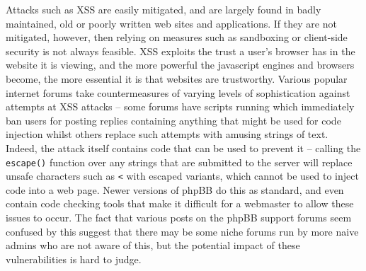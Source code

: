 Attacks such as XSS are easily mitigated\cite{cheatsheet}, and are largely found in badly maintained, old or poorly
written web sites and applications. If they are not mitigated, however, then relying on measures such as sandboxing or
client-side security is not always feasible. XSS exploits the trust a user's browser has in the website it is viewing,
and the more powerful the javascript engines and browsers become, the more essential it is that websites are
trustworthy. Various popular internet forums take countermeasures of varying levels of sophistication against attempts
at XSS attacks -- some forums have scripts running which immediately ban users for posting replies containing
anything that might be used for code injection whilst others replace such attempts with amusing strings of text. Indeed,
the attack itself contains code that can be used to prevent it -- calling the {\tt escape()} function over any strings
that are submitted to the server will replace unsafe characters such as {\tt <} with escaped variants, which cannot be
used to inject code into a web page. Newer versions of phpBB do this as standard, and even contain code checking tools
that make it difficult for a webmaster to allow these issues to occur. The fact that various posts on the phpBB support
forums seem confused by this suggest that there may be some niche forums run by more naive admins who are not aware of
this, but the potential impact of these vulnerabilities is hard to judge.
